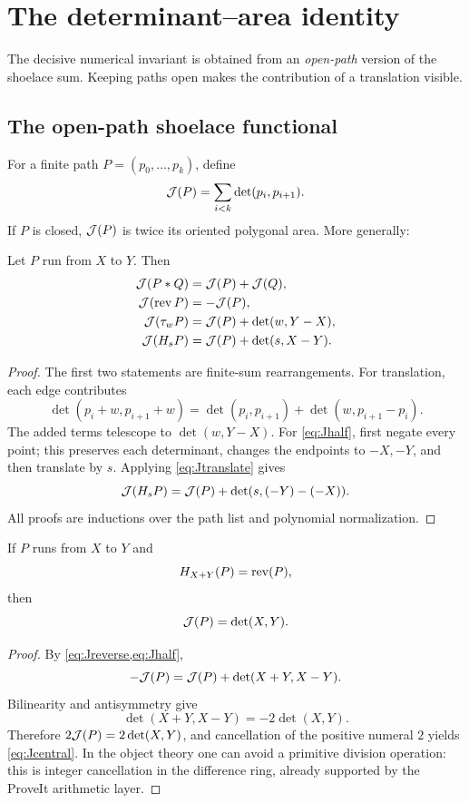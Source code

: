 \section{The determinant--area identity}
\label{sec:area}

The decisive numerical invariant is obtained from an \emph{open-path} version of the shoelace sum.  Keeping paths open makes the contribution of a translation visible.

\subsection{The open-path shoelace functional}

For a finite path \(P=(p_0,\ldots,p_k)\), define
\begin{equation}
 \mathcal J(P)=\sum_{i<k}\det(p_i,p_{i+1}).
 \label{eq:pathJ}
\end{equation}
If \(P\) is closed, \(\mathcal J(P)\) is twice its oriented polygonal area.  More generally:

\begin{lemma}
\label{lem:Jlaws}
Let \(P\) run from \(X\) to \(Y\).  Then
\begin{align}
 \mathcal J(P*Q)&=\mathcal J(P)+\mathcal J(Q),\label{eq:Jconcat}\\
 \mathcal J(\operatorname{rev} P)&=-\mathcal J(P),\label{eq:Jreverse}\\
 \mathcal J(\tau_{w} P)&=\mathcal J(P)+\det(w,Y-X),\label{eq:Jtranslate}\\
 \mathcal J(H_{s} P)&=\mathcal J(P)+\det(s,X-Y).\label{eq:Jhalf}
\end{align}
\end{lemma}
\begin{proof}
The first two statements are finite-sum rearrangements.  For translation, each edge contributes
\[
 \det(p_i+w,p_{i+1}+w)
 =\det(p_i,p_{i+1})+\det(w,p_{i+1}-p_i).
\]
The added terms telescope to \(\det(w,Y-X)\).  For \cref{eq:Jhalf}, first negate every point; this preserves each determinant, changes the endpoints to \(-X,-Y\), and then translate by \(s\).  Applying \cref{eq:Jtranslate} gives
\[
 \mathcal J(H_{s} P)=\mathcal J(P)+\det(s,(-Y)-(-X)).
\]
All proofs are inductions over the path list and polynomial normalization.
\end{proof}

\begin{lemma}
\label{lem:Jcentral}
If \(P\) runs from \(X\) to \(Y\) and
\[
 H_{X+Y}(P)=\operatorname{rev}(P),
\]
then
\begin{equation}
 \mathcal J(P)=\det(X,Y).
 \label{eq:Jcentral}
\end{equation}
\end{lemma}
\begin{proof}
By \cref{eq:Jreverse,eq:Jhalf},
\[
 -\mathcal J(P)
 =\mathcal J(P)+\det(X+Y,X-Y).
\]
Bilinearity and antisymmetry give
\[
 \det(X+Y,X-Y)=-2\det(X,Y).
\]
Therefore \(2\mathcal J(P)=2\det(X,Y)\), and cancellation of the positive numeral \(2\) yields \cref{eq:Jcentral}.  In the object theory one can avoid a primitive division operation: this is integer cancellation in the difference ring, already supported by the ProveIt arithmetic layer.
\end{proof}

